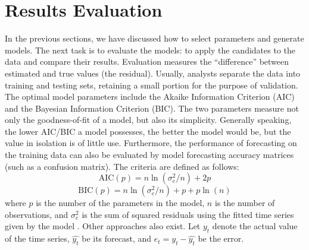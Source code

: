 \section{Results Evaluation}
In the previous sections, we have discussed how to select parameters and generate models. The next task is to evaluate the models: to apply the candidates to the data and compare their results. Evaluation measures the ``difference'' between estimated and true values (the residual). Usually, analysts separate the data into training and testing sets, retaining a small portion for the purpose of validation. The optimal model parameters include the Akaike Information Criterion (AIC) and the Bayesian Information Criterion (BIC). The two parameters measure not only the goodness-of-fit of a model, but also its simplicity. Generally speaking, the lower AIC/BIC a model possesses, the better the model would be, but the value in isolation is of little use. Furthermore, the performance of forecasting on the training data can also be evaluated by model forecasting accuracy matrices (such as a confusion matrix). The criteria are defined as follows:
\begin{equation*}
\mathrm{AIC}(p)=n \ln(\sigma^2_e/n)+2p 
\end{equation*}
\begin{equation*} 
\mathrm{BIC}(p)=n \ln(\sigma^2_e/n)+p+p \ln(n)
\end{equation*}
where $p$ is the number of the parameters in the model, $n$ is the number of observations, and $\sigma^2_e$ is the sum of squared residuals using the fitted time series given by the model . 
\newl Other approaches also exist. Let $y_t$ denote the actual value of the time series, $\hat{y_t}$ be its forecast, and $e_t=y_t-\hat{y_t}$ be the error.
